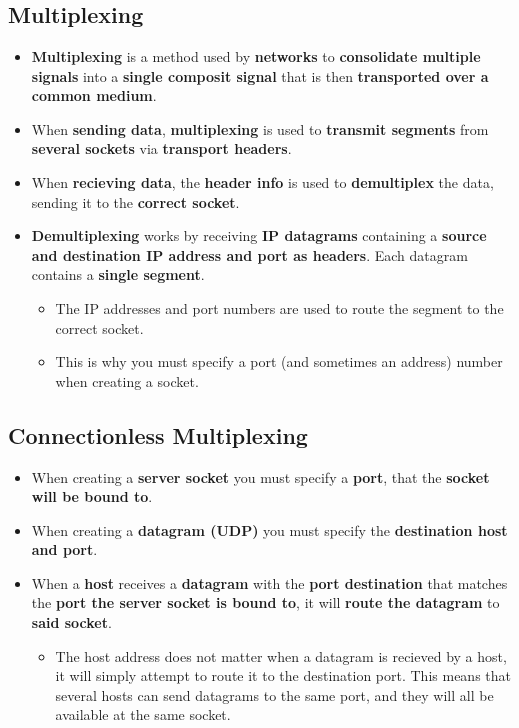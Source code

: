 \documentclass{article}
\begin{document}
    \section*{}
    
    \subsection*{Multiplexing}
    \begin{itemize}
        \item \textbf{Multiplexing} is a method used by \textbf{networks} to \textbf{consolidate multiple signals} into a \textbf{single composit signal} that is then \textbf{transported over a common medium}. 
        \item When \textbf{sending data}, \textbf{multiplexing} is used to \textbf{transmit segments} from \textbf{several sockets} via \textbf{transport headers}.
        \item When \textbf{recieving data}, the \textbf{header info} is used to \textbf{demultiplex} the data, sending it to the \textbf{correct socket}.
        \item \textbf{Demultiplexing} works by receiving \textbf{IP datagrams} containing a \textbf{source and destination IP address and port as headers}. Each datagram contains a \textbf{single segment}.
        \begin{itemize}
            \item The IP addresses and port numbers are used to route the segment to the correct socket.
            \item This is why you must specify a port (and sometimes an address) number when creating a socket.
        \end{itemize} 
    \end{itemize}

    \subsection*{Connectionless Multiplexing}
    \begin{itemize}
        \item When creating a \textbf{server socket} you must specify a \textbf{port}, that the \textbf{socket will be bound to}.
        \item When creating a \textbf{datagram (UDP)} you must specify the \textbf{destination host and port}.
        \item When a \textbf{host} receives a \textbf{datagram} with the \textbf{port destination} that matches the \textbf{port the server socket is bound to}, it will \textbf{route the datagram} to \textbf{said socket}.
        \begin{itemize}
            \item The host address does not matter when a datagram is recieved by a host, it will simply attempt to route it to the destination port. This means that several hosts can send datagrams to the same port, and they will all be available at the same socket.
        \end{itemize}  
    \end{itemize}
\end{document}
